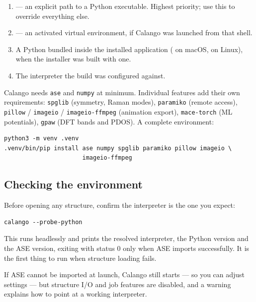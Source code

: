 \begin{enumerate}
  \item {} --- an explicit path to a Python
    executable. Highest priority; use this to override everything else.
  \item {} --- an activated virtual environment, if
    Calango was launched from that shell.
  \item A Python bundled inside the installed application
    ( on macOS,
     on Linux), when the installer
    was built with one.
  \item The interpreter the build was configured against.
\end{enumerate}

\begin{calwarn}
Calango needs \texttt{ase} and \texttt{numpy} at minimum. Individual
features add their own requirements: \texttt{spglib} (symmetry, Raman
modes), \texttt{paramiko} (remote access), \texttt{pillow} /
\texttt{imageio} / \texttt{imageio-ffmpeg} (animation export),
\texttt{mace-torch} (ML potentials), \texttt{gpaw} (DFT bands and PDOS). A complete environment:
\begin{lstlisting}
python3 -m venv .venv
.venv/bin/pip install ase numpy spglib paramiko pillow imageio \
                      imageio-ffmpeg
\end{lstlisting}
\end{calwarn}

\subsection{Checking the environment}

Before opening any structure, confirm the interpreter is the one you
expect:

\begin{lstlisting}
calango --probe-python
\end{lstlisting}

This runs headlessly and prints the resolved interpreter, the Python
version and the ASE version, exiting with status 0 only when ASE imports
successfully. It is the first thing to run when structure loading fails.

If ASE cannot be imported at launch, Calango still starts --- so you can
adjust settings --- but structure I/O and job features are disabled, and a
warning explains how to point at a working interpreter.

